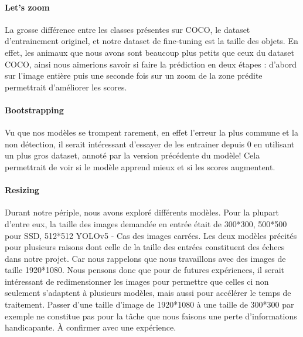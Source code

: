 \paragraph{Let's zoom} La grosse différence entre les classes présentes sur COCO, le dataset d'entrainement originel, et notre dataset de fine-tuning est la taille des objets. En effet, les animaux que nous avons sont beaucoup plus petits que ceux du dataset COCO, ainsi nous aimerions savoir si faire la prédiction en deux étapes : d'abord sur l'image entière puis une seconde fois sur un zoom de la zone prédite permettrait d'améliorer les scores.

\paragraph{Bootstrapping} Vu que nos modèles se trompent rarement, en effet l'erreur la plus commune et la non détection, il serait intéressant d'essayer de les entrainer depuis $0$ en utilisant un plus gros dataset, annoté par la version précédente du modèle! Cela permettrait de voir si le modèle apprend mieux et si les scores augmentent.

\paragraph{Resizing} Durant notre périple, nous avons exploré différents modèles. Pour la plupart d'entre eux, la taille des images demandée en entrée était de 300*300, 500*500 pour SSD, 512*512 YOLOv5 - Cas des images carrées. Les deux modèles précités pour plusieurs raisons dont celle de la taille des entrées constituent des échecs dans notre projet. Car nous rappelons que nous travaillons avec des images de taille 1920*1080. Nous pensons donc que pour de futures expériences, il serait intéressant de redimensionner les images pour permettre que celles ci non seulement s'adaptent à plusieurs modèles, mais aussi pour accélérer le temps de traitement. Passer d'une taille d'image de 1920*1080 à une taille de 300*300 par exemple ne constitue pas pour la tâche que nous faisons une perte d'informations handicapante. À confirmer avec une expérience. 
